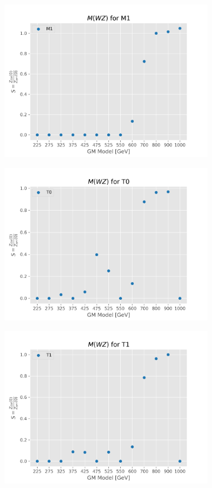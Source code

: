 \documentclass[../Bachelorarbeit.tex]{subfiles}
\begin{document}
\begin{figure}[h]
\begin{subfigure}{0.45\textwidth}
        \includegraphics[width=\textwidth]{Plots/gm_relevanze/MWZ_op_M1.png}
    \end{subfigure}
    \begin{subfigure}{0.45\textwidth}
        \includegraphics[width=\textwidth]{Plots/gm_relevanze/MWZ_op_T0.png}
    \end{subfigure}
    \begin{subfigure}{0.45\textwidth}
        \includegraphics[width=\textwidth]{Plots/gm_relevanze/MWZ_op_T1.png}

\end{subfigure}
\end{figure}
\end{document}
